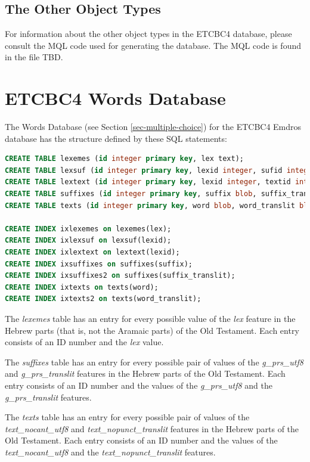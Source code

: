 \documentclass[11pt,oneside,a4paper]{memoir}
\begin{document}
\section{The Other Object Types}

For information about the other object types in the ETCBC4 database, please consult the MQL code
used for generating the database. The MQL code is found in the file TBD.

\chapter{ETCBC4 Words Database}\label{worddb-app}

The Words Database (see Section \ref{sec-multiple-choice}) for the ETCBC4 Emdros database has the
structure defined by these SQL statements:

\begin{lstlisting}[language=SQL]
CREATE TABLE lexemes (id integer primary key, lex text);
CREATE TABLE lexsuf (id integer primary key, lexid integer, sufid integer);
CREATE TABLE lextext (id integer primary key, lexid integer, textid integer);
CREATE TABLE suffixes (id integer primary key, suffix blob, suffix_translit blot);
CREATE TABLE texts (id integer primary key, word blob, word_translit blob);

CREATE INDEX ixlexemes on lexemes(lex);
CREATE INDEX ixlexsuf on lexsuf(lexid);
CREATE INDEX ixlextext on lextext(lexid);
CREATE INDEX ixsuffixes on suffixes(suffix);
CREATE INDEX ixsuffixes2 on suffixes(suffix_translit);
CREATE INDEX ixtexts on texts(word);
CREATE INDEX ixtexts2 on texts(word_translit);
\end{lstlisting}

The \emph{lexemes} table has an entry for every possible value of the \emph{lex} feature in the
Hebrew parts (that is, not the Aramaic parts) of the Old Testament. Each entry consists of an ID
number and the \emph{lex} value.

The \emph{suffixes} table has an entry for every possible pair of values of the \emph{g\_prs\_utf8}
and \emph{g\_prs\_translit} features in the Hebrew parts of the Old Testament. Each entry consists
of an ID number and the values of the \emph{g\_prs\_utf8} and the \emph{g\_prs\_translit} features.

The \emph{texts} table has an entry for every possible pair of values of the
\emph{text\_nocant\_utf8} and \emph{text\_nopunct\_translit} features
in the Hebrew parts of the Old Testament. Each entry consists of an ID number and the values of the
\emph{text\_nocant\_utf8} and the \emph{text\_nopunct\_translit} features.
\end{document}
